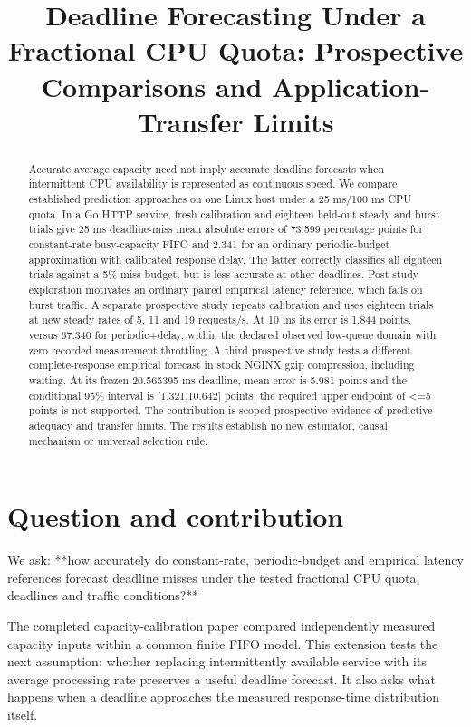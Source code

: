 \documentclass[11pt,a4paper]{article}
\title{Deadline Forecasting Under a Fractional CPU Quota: Prospective Comparisons and Application-Transfer Limits}
\author{}
\date{}
\begin{document}
\maketitle
\begin{abstract}

Accurate average capacity need not imply accurate deadline forecasts when
intermittent CPU availability is represented as continuous speed. We compare
established prediction approaches on one Linux host under a 25 ms/100 ms CPU
quota. In a Go HTTP service, fresh calibration and eighteen held-out steady
and burst trials give 25 ms deadline-miss mean absolute errors of 73.599
percentage points for constant-rate busy-capacity FIFO and 2.341 for an
ordinary periodic-budget approximation with calibrated response delay.
The latter correctly classifies all eighteen trials against a 5\% miss budget,
but is less accurate at other deadlines. Post-study exploration motivates an
ordinary paired empirical latency reference, which fails on burst traffic.
A separate prospective study repeats calibration and uses eighteen trials at
new steady rates of 5, 11 and 19 requests/s. At 10 ms its error is 1.844 points,
versus 67.340 for periodic+delay, within the declared observed low-queue domain
with zero recorded measurement throttling. A third prospective study tests a
different complete-response empirical forecast in stock NGINX gzip compression,
including waiting. At its frozen 20.565395 ms deadline, mean error is 5.981
points and the conditional 95\% interval is [1.321,10.642] points; the required
upper endpoint of <=5 points is not supported. The contribution is scoped
prospective evidence of predictive adequacy and transfer limits. The results
establish no new estimator, causal mechanism or universal selection rule.

\end{abstract}
\section{Question and contribution}

We ask: **how accurately do constant-rate, periodic-budget and empirical
latency references forecast deadline misses under the tested fractional CPU
quota, deadlines and traffic conditions?**

The completed capacity-calibration paper compared independently measured
capacity inputs within a common finite FIFO model. This extension tests the
next assumption: whether replacing intermittently available service with its
average processing rate preserves a useful deadline forecast. It also asks
what happens when a deadline approaches the measured response-time
distribution itself.
\end{document}
